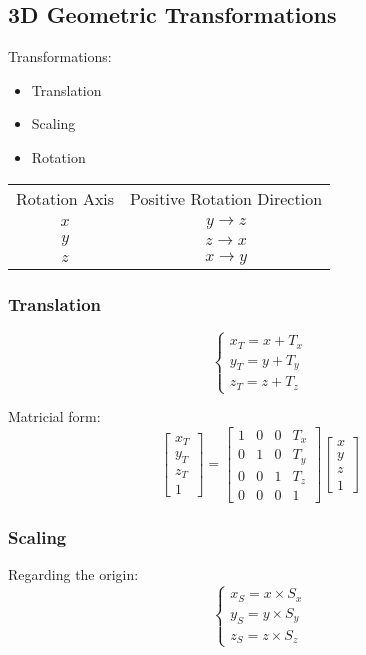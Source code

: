 \documentclass[a4paper]{article}
\begin{document}
\begin{flushleft}
\subsection{3D Geometric Transformations}
Transformations:
\begin{itemize}
	\item Translation
	\item Scaling
	\item Rotation
\end{itemize}

\begin{tabular}{ c c }
 Rotation Axis & Positive Rotation Direction \\
 $x$ & $y \rightarrow z$ \\ 
 $y$ & $z \rightarrow x$ \\  
 $z$ & $x \rightarrow y$
\end{tabular}

\subsubsection{Translation}
\begin{equation}
\begin{cases}
	x_T = x + T_x \\
	y_T = y + T_y \\
	z_T = z + T_z
\end{cases}
\end{equation}

Matricial form:
\begin{equation}
\begin{bmatrix}
	x_T \\
	y_T \\
	z_T \\
	1
\end{bmatrix}
=
\begin{bmatrix}
	1 & 0 & 0 & T_x \\
	0 & 1 & 0 & T_y \\
	0 & 0 & 1 & T_z \\
	0 & 0 & 0 & 1
\end{bmatrix}
\begin{bmatrix}
	x \\
	y \\
	z \\
	1
\end{bmatrix}
\end{equation}

\subsubsection{Scaling}
Regarding the origin:
\begin{equation}
\begin{cases}
	x_S = x \times S_x \\
	y_S = y \times S_y \\
	z_S = z \times S_z
\end{cases}
\end{equation}


\end{flushleft}
\end{document}
